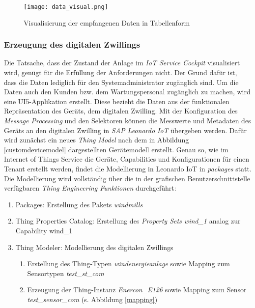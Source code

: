 \begin{figure}[H]
  \texttt{[image: data\_visual.png]}
  \caption{Visualisierung der empfangenen Daten in Tabellenform}
  \label{datavisual}
\end{figure}

\subsubsection{Erzeugung des digitalen Zwillings}

Die Tatsache, dass der Zustand der Anlage im \textit{IoT Service Cockpit} visualisiert wird, genügt für die Erfüllung der Anforderungen nicht. Der Grund dafür ist, dass die Daten lediglich für den Systemadministrator zugänglich sind. Um die Daten auch den Kunden bzw. dem Wartungspersonal zugänglich zu machen, wird eine UI5-Applikation erstellt. Diese bezieht die Daten aus der funktionalen Repräsentation des Geräts, dem digitalen Zwilling. Mit der Konfiguration des \textit{Message Processing} und den Selektoren können die Messwerte und Metadaten des Geräts an den digitalen Zwilling in \textit{SAP Leonardo IoT} übergeben werden. Dafür wird zunächst ein neues \textit{Thing Model} nach dem in Abbildung \ref{customdevicemodel} dargestellten Gerätemodell erstellt. Genau so, wie im Internet of Things Service die Geräte, Capabilities und Konfigurationen für einen Tenant erstellt werden, findet die Modellierung in Leonardo IoT in \textit{packages} statt. Die Modellierung wird vollständig über die in der grafischen Benutzerschnittstelle verfügbaren \textit{Thing Engineering Funktionen} durchgeführt:
\begin{enumerate}
  \item Packages: Erstellung des Pakets \textit{windmills}
  \item Thing Properties Catalog: Erstellung des \textit{Property Sets wind\_1} analog zur Capability wind\_1
  \item Thing Modeler: Modellierung des digitalen Zwillings
  \begin{enumerate}
    \item Erstellung des Thing-Typen \textit{windenergieanlage} sowie Mapping zum Sensortypen \textit{test\_st\_com}
    \item Erzeugung der Thing-Instanz \textit{Enercon\_E126} sowie Mapping zum Sensor \newline \textit{test\_sensor\_com} (s. Abbildung \ref{mapping})
  \end{enumerate}
\end{enumerate}

